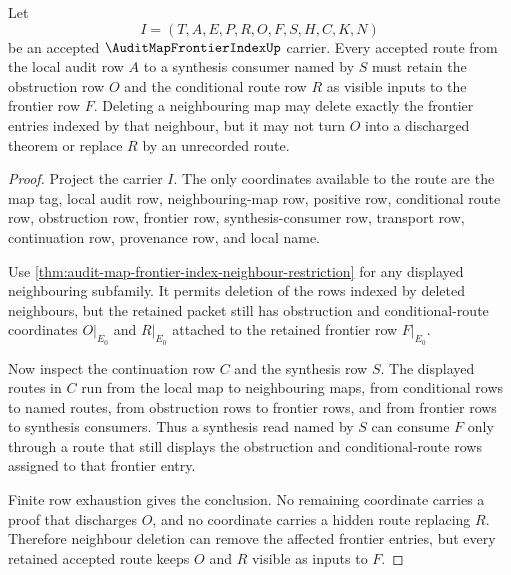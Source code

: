 \begin{theorem}
\label{thm:audit-map-frontier-index-obstruction-route}
Let
$$
I=(T,A,E,P,R,O,F,S,H,C,K,N)
$$
be an accepted $\AuditMapFrontierIndexUp$ carrier. Every accepted route from the local audit row $A$ to a synthesis consumer named by $S$ must retain the obstruction row $O$ and the conditional route row $R$ as visible inputs to the frontier row $F$. Deleting a neighbouring map may delete exactly the frontier entries indexed by that neighbour, but it may not turn $O$ into a discharged theorem or replace $R$ by an unrecorded route.
\end{theorem}
\begin{proof}
Project the carrier $I$. The only coordinates available to the route are the map tag, local audit row, neighbouring-map row, positive row, conditional route row, obstruction row, frontier row, synthesis-consumer row, transport row, continuation row, provenance row, and local name.

Use \autoref{thm:audit-map-frontier-index-neighbour-restriction} for any displayed neighbouring subfamily. It permits deletion of the rows indexed by deleted neighbours, but the retained packet still has obstruction and conditional-route coordinates $O|_{E_0}$ and $R|_{E_0}$ attached to the retained frontier row $F|_{E_0}$.

Now inspect the continuation row $C$ and the synthesis row $S$. The displayed routes in $C$ run from the local map to neighbouring maps, from conditional rows to named routes, from obstruction rows to frontier rows, and from frontier rows to synthesis consumers. Thus a synthesis read named by $S$ can consume $F$ only through a route that still displays the obstruction and conditional-route rows assigned to that frontier entry.

Finite row exhaustion gives the conclusion. No remaining coordinate carries a proof that discharges $O$, and no coordinate carries a hidden route replacing $R$. Therefore neighbour deletion can remove the affected frontier entries, but every retained accepted route keeps $O$ and $R$ visible as inputs to $F$.
\end{proof}
